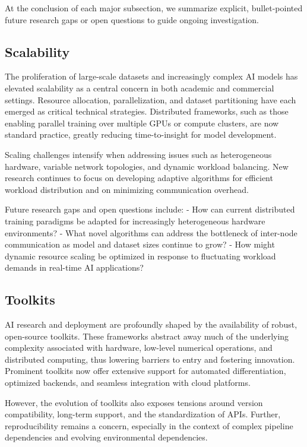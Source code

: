\documentclass[sigconf]{acmart}
\begin{document}
At the conclusion of each major subsection, we summarize explicit, bullet-pointed future research gaps or open questions to guide ongoing investigation.

\subsection{Scalability}
The proliferation of large-scale datasets and increasingly complex AI models has elevated scalability as a central concern in both academic and commercial settings. Resource allocation, parallelization, and dataset partitioning have each emerged as critical technical strategies. Distributed frameworks, such as those enabling parallel training over multiple GPUs or compute clusters, are now standard practice, greatly reducing time-to-insight for model development.

Scaling challenges intensify when addressing issues such as heterogeneous hardware, variable network topologies, and dynamic workload balancing. New research continues to focus on developing adaptive algorithms for efficient workload distribution and on minimizing communication overhead.

Future research gaps and open questions include:
- How can current distributed training paradigms be adapted for increasingly heterogeneous hardware environments?
- What novel algorithms can address the bottleneck of inter-node communication as model and dataset sizes continue to grow?
- How might dynamic resource scaling be optimized in response to fluctuating workload demands in real-time AI applications?

\subsection{Toolkits}
AI research and deployment are profoundly shaped by the availability of robust, open-source toolkits. These frameworks abstract away much of the underlying complexity associated with hardware, low-level numerical operations, and distributed computing, thus lowering barriers to entry and fostering innovation. Prominent toolkits now offer extensive support for automated differentiation, optimized backends, and seamless integration with cloud platforms.

However, the evolution of toolkits also exposes tensions around version compatibility, long-term support, and the standardization of APIs. Further, reproducibility remains a concern, especially in the context of complex pipeline dependencies and evolving environmental dependencies.
\end{document}
